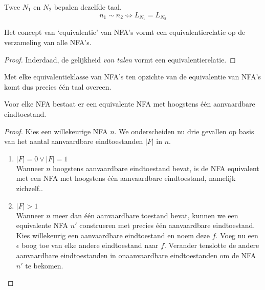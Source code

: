\documentclass[main.tex]{subfiles}
\begin{document}
\begin{de}
  Twee  $N_{1}$ en $N_{2}$ bepalen dezelfde taal.
  \[ n_{1} \sim n_{2} \Leftrightarrow L_{N_{1}} = L_{N_{2}} \]
\end{de}

\begin{st}
  \label{st:equivalentierelatie-NFA}
  Het concept van `equivalentie' van NFA's vormt een equivalentierelatie op de verzameling van alle NFA's.

  \begin{proof}
    Inderdaad, de gelijkheid \textit{van talen} vormt een equivalentierelatie.
  \end{proof}
\end{st}

\begin{opm}
  Met elke equivalentieklasse van NFA's ten opzichte van de equivalentie van NFA's komt dus precies \'e\'en taal overeen.
\end{opm}

\begin{st}
  \label{st:hoogstens-een-eindtoestand-NFA}
  Voor elke NFA bestaat er een equivalente NFA met hoogstens \'e\'en aanvaardbare eindtoestand.

  \begin{proof}
    Kies een willekeurige NFA $n$.
    We onderscheiden nu drie gevallen op basis van het aantal aanvaardbare eindtoestanden $|F|$ in $n$.
    \begin{enumerate}
    \item $|F| = 0 \vee |F| = 1$\\
      Wanneer $n$ hoogstens aanvaardbare eindtoestand bevat, is de NFA equivalent met een NFA met hoogstens \'e\'en aanvaardbare eindtoestand, namelijk zichzelf..
    \item $|F| > 1$\\
      Wanneer $n$ meer dan \'e\'en aanvaardbare toestand bevat, kunnen we een equivalente NFA $n'$ construeren met precies \'e\'en aanvaardbare eindtoestand.
      Kies willekeurig een aanvaardbare eindtoestand en noem deze $f$. 
      Voeg nu een $\epsilon$ boog toe van elke andere eindtoestand naar $f$.
      Verander tenslotte de andere aanvaardbare eindtoestanden in onaanvaardbare eindtoestanden om de NFA $n'$ te bekomen.
    \end{enumerate}
  \end{proof}
\end{st}
\end{document}
